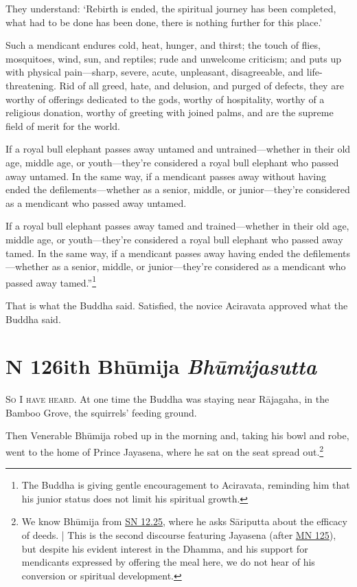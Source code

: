 \documentclass[12pt,openany]{book}%
\newcommand*{\suttatitleacronym}[1]{\smaller[2]{#1}\vspace*{.3em}}
\newcommand*{\suttatitletranslation}[1]{\linebreak{#1}}
\newcommand*{\suttatitleroot}[1]{\linebreak\smaller[2]\itshape{#1}}
\newcommand*{\tocacronym}[1]{\hspace*{-3.3em}{#1}\quad}
\newcommand*{\toctranslation}[1]{#1}
\newcommand*{\tocroot}[1]{(\textit{#1})}
\newcommand*{\scevam}[1]{\textsc{#1}}
\begin{document}
They understand: ‘Rebirth is ended, the spiritual journey has been completed, what had to be done has been done, there is nothing further for this place.’ 

Such a mendicant endures cold, heat, hunger, and thirst; the touch of flies, mosquitoes, wind, sun, and reptiles; rude and unwelcome criticism; and puts up with physical pain—sharp, severe, acute, unpleasant, disagreeable, and life-threatening. Rid of all greed, hate, and delusion, and purged of defects, they are worthy of offerings dedicated to the gods, worthy of hospitality, worthy of a religious donation, worthy of greeting with joined palms, and are the supreme field of merit for the world. 

If a royal bull elephant passes away untamed and untrained—whether in their old age, middle age, or youth—they’re considered a royal bull elephant who passed away untamed. In the same way, if a mendicant passes away without having ended the defilements—whether as a senior, middle, or junior—they’re considered as a mendicant who passed away untamed. 

If a royal bull elephant passes away tamed and trained—whether in their old age, middle age, or youth—they’re considered a royal bull elephant who passed away tamed. In the same way, if a mendicant passes away having ended the defilements—whether as a senior, middle, or junior—they’re considered as a mendicant who passed away tamed.”\footnote{The Buddha is giving gentle encouragement to Aciravata, reminding him that his junior status does not limit his spiritual growth. } 

That is what the Buddha said. Satisfied, the novice Aciravata approved what the Buddha said. 

%
\section*{{\suttatitleacronym MN 126}{\suttatitletranslation With Bhūmija }{\suttatitleroot Bhūmijasutta}}
\addcontentsline{toc}{section}{\tocacronym{MN 126} \toctranslation{With Bhūmija } \tocroot{Bhūmijasutta}}

\scevam{So I have heard. }At one time the Buddha was staying near \textsanskrit{Rājagaha}, in the Bamboo Grove, the squirrels’ feeding ground. 

Then Venerable \textsanskrit{Bhūmija} robed up in the morning and, taking his bowl and robe, went to the home of Prince Jayasena, where he sat on the seat spread out.\footnote{We know \textsanskrit{Bhūmija} from \href{https://suttacentral.net/sn12.25/en/sujato}{SN 12.25}, where he asks \textsanskrit{Sāriputta} about the efficacy of deeds. | This is the second discourse featuring Jayasena (after \href{https://suttacentral.net/mn125/en/sujato}{MN 125}), but despite his evident interest in the Dhamma, and his support for mendicants expressed by offering the meal here, we do not hear of his conversion or spiritual development. } 
\end{document}
